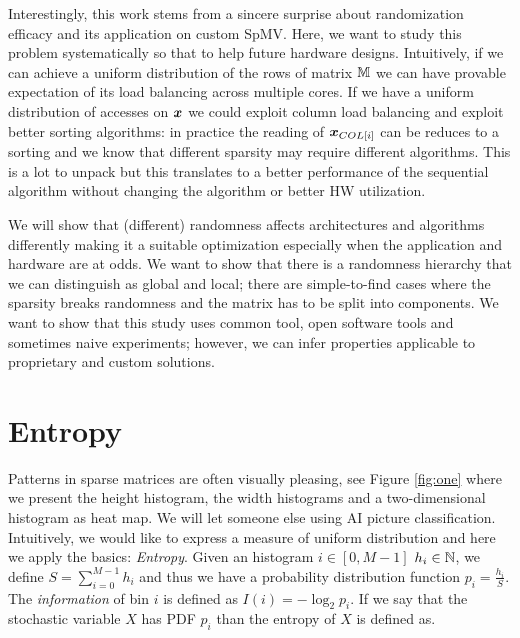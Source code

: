 \documentclass[manuscript,screen]{acmart}
\begin{document}
Interestingly, this work stems from a sincere surprise about
randomization efficacy and its application on custom SpMV. Here, we
want to study this problem systematically so that to help future
hardware designs. Intuitively, if we can achieve a uniform
distribution of the rows of matrix $\mathbb{M}$ we can have provable
expectation of its load balancing across multiple cores. If we have a
uniform distribution of accesses on ${\boldsymbol x}$ we could exploit column
load balancing and exploit better sorting algorithms: in practice the
reading of ${\boldsymbol x}_{COL[i]}$ can be reduces to a sorting and we know
that different sparsity may require different algorithms. This is a
lot to unpack but this translates to a better performance of the
sequential algorithm without changing the algorithm or better HW
utilization.


We will show that (different) randomness affects architectures and
algorithms differently making it a suitable optimization especially
when the application and hardware are at odds. We want to show that
there is a randomness hierarchy that we can distinguish as global and
local; there are simple-to-find cases where the sparsity breaks
randomness and the matrix has to be split into components.  We want to
show that this study uses common tool, open software tools and
sometimes naive experiments; however, we can infer properties
applicable to proprietary and custom solutions. 

\newpage 
{}

\section{Entropy}
\label{sec:entropy}
Patterns in sparse matrices are often visually pleasing, see Figure
\ref{fig:one} where we present the height histogram, the width
histograms and a two-dimensional histogram as heat map. We will let
someone else using AI picture classification. Intuitively, we would
like to express a measure of uniform distribution and here we apply
the basics: {\em Entropy}. Given an histogram $i\in[0,M-1]$ $h_i \in
\mathbb{N}$, we define $S =\sum_{i=0}^{M-1}h_i$ and thus we have a probability
distribution function $p_i = \frac{h_i}{S}$. The {\em information} of
bin $i$ is defined as $I(i) = -\log_2 p_i$. If we say that the
stochastic variable $X$ has PDF $p_i$ than the entropy of $X$ is
defined as.
\end{document}
